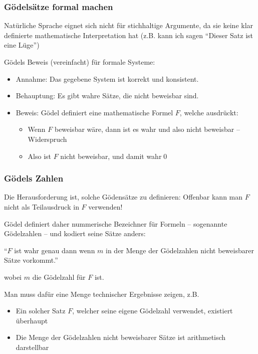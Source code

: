 \documentclass[onlymath]{beamer}
\begin{document}
\begin{frame}\frametitle{Gödelsätze formal machen}

Natürliche Sprache eignet sich nicht für stichhaltige Argumente, da sie keine klar definierte mathematische Interpretation hat (z.B. kann ich sagen "`Dieser Satz ist eine Lüge"')
\bigskip\pause

Gödels Beweis (vereinfacht) für formale Systeme:
\begin{itemize}
\item \alert{Annahme:} Das gegebene System ist korrekt und konsistent.
\item \alert{Behauptung:} Es gibt wahre Sätze, die nicht beweisbar sind.
\item \alert{Beweis:} Gödel definiert eine mathematische Formel $F$, welche ausdrückt:\\[1ex]
\smallskip

\begin{itemize}
\item Wenn $F$ beweisbar wäre, dann ist es wahr und also nicht beweisbar -- Widerspruch
\item Also ist $F$ nicht beweisbar, und damit wahr\qed
\end{itemize}
\end{itemize}

\end{frame}

\begin{frame}\frametitle{Gödels Zahlen}

\smallskip

Die Herausforderung ist, solche Gödensätze zu definieren:
Offenbar kann man $F$ nicht als Teilausdruck in $F$ verwenden!
\bigskip\pause

Gödel definiert daher nummerische Bezeichner für Formeln -- sogenannte Gödelzahlen -- und kodiert seine Sätze anders:
\begin{center}\alert{"`$F$ ist wahr genau dann wenn $m$ in der Menge der Gödelzahlen nicht beweisbarer Sätze vorkommt."'} \end{center}
wobei $m$ die Gödelzahl für $F$ ist.\medskip

Man muss dafür eine Menge technischer Ergebnisse zeigen, z.B.
\begin{itemize}
\item Ein solcher Satz $F$, welcher seine eigene Gödelzahl verwendet, existiert überhaupt
\item Die Menge der Gödelzahlen nicht beweisbarer Sätze ist arithmetisch darstellbar
\end{itemize}

\end{frame}
\end{document}
